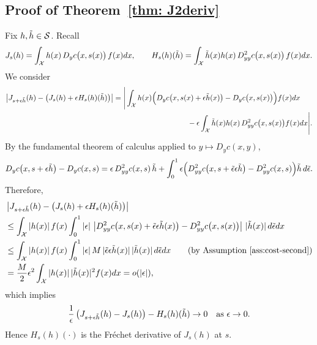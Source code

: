 \documentclass[12pt,leqno]{amsart}
\begin{document}
\subsection{Proof of Theorem~\ref{thm: J2deriv}}
Fix $h,\Tilde h\in\mathcal{S}$. Recall
\[
J_s(h)=\int_{\mathcal{X}} h(x)\,D_y c\big(x,s(x)\big)\,f(x)dx,
\qquad
H_s(h)(\Tilde h)=\int_{\mathcal{X}}\Tilde h(x)h(x)\,D^2_{yy}c\big(x,s(x)\big)\,f(x)dx .
\]
We consider
\begin{align*}
\left|J_{s+\epsilon\Tilde h}(h)-\big(J_s(h)+\epsilon H_s(h)(\Tilde h)\big)\right|
&=\Bigg|\int_{\mathcal{X}} h(x)\Big(D_y c\big(x,s(x)+\epsilon\Tilde h(x)\big)-D_y c\big(x,s(x)\big)\Big)f(x)dx\\
&\qquad\qquad\qquad\qquad\qquad
-\epsilon\int_{\mathcal{X}}\Tilde h(x)h(x)\,D^2_{yy}c\big(x,s(x)\big)f(x)dx\Bigg|.
\end{align*}
By the fundamental theorem of calculus applied to $y\mapsto D_y c(x,y)$,
\[
D_y c\big(x,s+\epsilon\Tilde h\big)-D_y c(x,s)
=\epsilon\,D^2_{yy}c(x,s)\,\Tilde h
+\int_0^1\epsilon\Big(D^2_{yy}c\big(x,s+\tilde{\epsilon}\epsilon\Tilde h\big)-D^2_{yy}c(x,s)\Big)\Tilde h\,d\tilde{\epsilon} .
\]
Therefore,
\begin{align*}
&\left|J_{s+\epsilon\Tilde h}(h)-\big(J_s(h)+\epsilon H_s(h)(\Tilde h)\big)\right|\\
&\le \int_{\mathcal{X}}|h(x)|\,f(x)\int_0^1 |\epsilon|\,
\left|D^2_{yy}c\big(x,s(x)+\tilde{\epsilon}\epsilon\Tilde h(x)\big)-D^2_{yy}c\big(x,s(x)\big)\right|\,|\Tilde h(x)|\,d\tilde{\epsilon}dx\\
&\le \int_{\mathcal{X}}|h(x)|\,f(x)\int_0^1 |\epsilon|\, M\,|\tilde{\epsilon}\epsilon\Tilde h(x)|\,|\Tilde h(x)|\,d\tilde{\epsilon}dx
\qquad\text{(by Assumption~\ref{ass:cost-second})}\\
&=\frac{M}{2}\epsilon^2\int_{\mathcal{X}}|h(x)|\,|\Tilde h(x)|^2 f(x)dx
=o(|\epsilon|),
\end{align*}
which implies
\[
\frac{1}{\epsilon}\left(J_{s+\epsilon\Tilde h}(h)-J_s(h)\right)-H_s(h)(\Tilde h)\to 0
\quad\text{as }\epsilon\to 0.
\]
Hence $H_s(h)(\cdot)$ is the Fr\'echet derivative of $J_s(h)$ at $s$.
\end{document}
